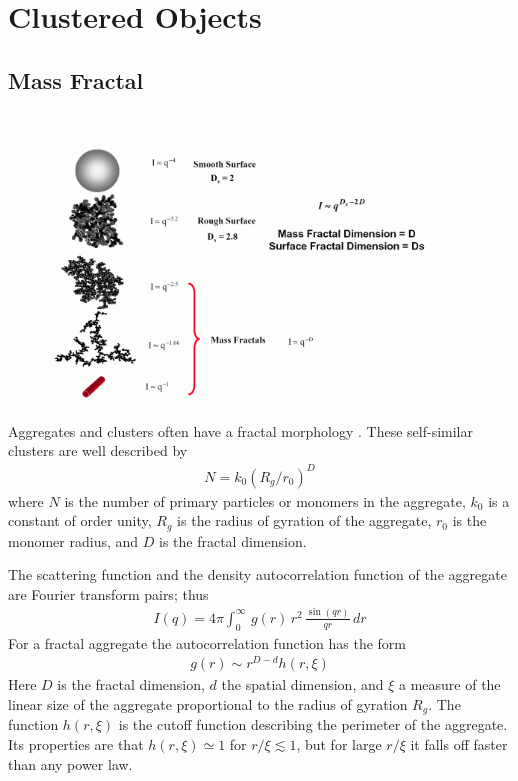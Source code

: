 \clearpage
\section{Clustered Objects}
\label{sect:ClusteredObjects}

\subsection{Mass Fractal}
\label{sect:MassFractal}
\hspace{1pt} \\

\begin{figure}[htb]
\begin{center}
\includegraphics[width=0.9\textwidth]{../images/form_factor/cluster/fractaldimension.png}
\end{center}
\caption{} \label{fractaldimension}
\end{figure}

Aggregates and clusters often have a fractal morphology \cite{Sorensen1999,Sorensen1992,Hurd1988,Lin1989,Lin1990,Lin1990a,Lin1990b}. These self-similar clusters are well
described by
\begin{align}
N=k_0(R_g/r_0)^D
\end{align}
where $N$ is the number of primary particles or monomers in the aggregate,
$k_0$ is a constant of order unity, $R_g$ is the radius of gyration of the aggregate,
$r_0$ is the monomer radius, and $D$ is the fractal dimension.

The scattering function and the density autocorrelation function
of the aggregate are Fourier transform pairs; thus
\begin{align}
I(q)=4\pi \int_0^\infty \, g(r)\, r^2\, \frac{\sin(qr)}{qr}\, dr
\label{eq:aggregateSQ}
\end{align}
For a fractal aggregate the autocorrelation function has the
form
\begin{align}
g(r) \sim r^{D-d} h(r,\xi)
\label{eq:aggregate_g(r)}
\end{align}
Here $D$ is the fractal dimension, $d$ the spatial dimension, and
$\xi$ a measure of the linear size of the aggregate proportional to
the radius of gyration $R_g$. The function $h(r,\xi)$ is the cutoff
function describing the perimeter of the aggregate. Its properties
are that $h(r,\xi) \simeq 1$ for $r/\xi \lesssim 1$, but for large
$r/\xi$ it falls off faster than any power law.

